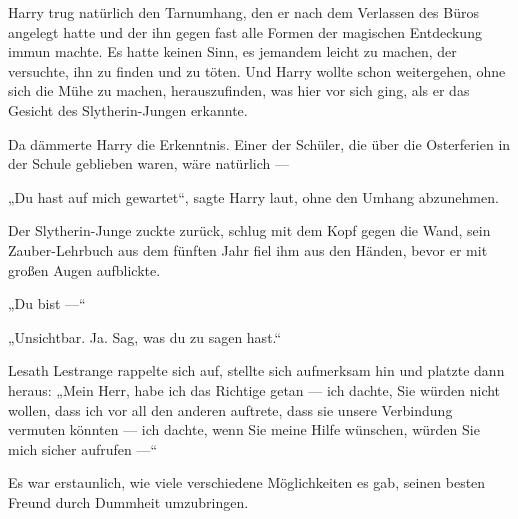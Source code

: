 Harry trug natürlich den Tarnumhang, den er nach dem Verlassen des Büros angelegt hatte und der ihn gegen fast alle Formen der magischen Entdeckung immun machte. Es hatte keinen Sinn, es jemandem leicht zu machen, der versuchte, ihn zu finden und zu töten. Und Harry wollte schon weitergehen, ohne sich die Mühe zu machen, herauszufinden, was hier vor sich ging, als er das Gesicht des Slytherin-Jungen erkannte.

Da dämmerte Harry die Erkenntnis. Einer der Schüler, die über die Osterferien in der Schule geblieben waren, wäre natürlich —

„Du hast auf mich gewartet“, sagte Harry laut, ohne den Umhang abzunehmen.

Der Slytherin-Junge zuckte zurück, schlug mit dem Kopf gegen die Wand, sein Zauber-Lehrbuch aus dem fünften Jahr fiel ihm aus den Händen, bevor er mit großen Augen aufblickte.

„Du bist —“

„Unsichtbar. Ja. Sag, was du zu sagen hast.“

Lesath Lestrange rappelte sich auf, stellte sich aufmerksam hin und platzte dann heraus:
„Mein Herr, habe ich das Richtige getan — ich dachte, Sie würden nicht wollen, dass ich vor all den anderen auftrete, dass sie unsere Verbindung vermuten könnten — ich dachte, wenn Sie meine Hilfe wünschen, würden Sie mich sicher aufrufen —“

Es war erstaunlich, wie viele verschiedene Möglichkeiten es gab, seinen besten Freund durch Dummheit umzubringen.

